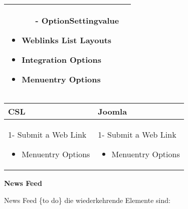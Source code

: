 \begin{minipage}{0.7\textwidth}
\begin{tabular}{|p{} | p{}|}
\begin{itemize}
\begin{enumerate}
   		    			 \item[-] OptionSettingvalue
   		    	\end{enumerate}
   	\item Weblinks List Layouts
   	\item Integration Options
	\item Menuentry Options
 \end{itemize}
\\
\hline
\end{tabular}
\end{minipage}

\begin{minipage}{0.7\textwidth}
\begin{tabular}{|p{} | p{}|}
\hline
\textbf{CSL} & \textbf{Joomla} \\ 
\hline
 1- Submit a Web Link
 \begin{itemize}
 	\item Menuentry Options
  \end{itemize}
 & 
1- Submit a Web Link
 \begin{itemize}
	\item Menuentry Options
 \end{itemize}
\\
\hline
\end{tabular}
\end{minipage}

\textbf{News Feed}

News Feed \{to do\} die wiederkehrende Elemente sind:

